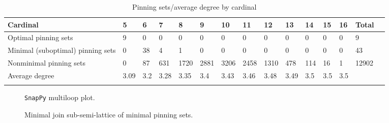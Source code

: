 \documentclass{article}%
\begin{document}
\begin{table}[ht]
	\caption{Pinning sets/average degree by cardinal}
	\centering
	\renewcommand{\arraystretch}{1.5}
	\begin{tabularx}{\textwidth}{lXXXXXXXXXXXXXX}
		\toprule
			Cardinal & 5 & 6 & 7 & 8 & 9 & 10 & 11 & 12 & 13 & 14 & 15 & 16 & Total\\
			\hline
			Optimal pinning sets & 9 & 0 & 0 & 0 & 0 & 0 & 0 & 0 & 0 & 0 & 0 & 0 & 9 \\
			Minimal (suboptimal) pinning sets & 0 & 38 & 4 & 1 & 0 & 0 & 0 & 0 & 0 & 0 & 0 & 0 & 43 \\
			Nonminimal pinning sets & 0 & 87 & 631 & 1720 & 2881 & 3206 & 2458 & 1310 & 478 & 114 & 16 & 1 & 12902 \\
			Average degree & 3.09 & 3.2 & 3.28 & 3.35 & 3.4 & 3.43 & 3.46 & 3.48 & 3.49 & 3.5 & 3.5 & 3.5 &  \\
		\bottomrule \\ 
	\end{tabularx}
\end{table}

\begin{multicols}{2}
\begin{figure}[H]
\centering

\caption{\texttt{SnapPy} multiloop plot.}
\label{fig:tex/img/[[5, 28, 6, 1], [15, 4, 16, 5], [10, 27, 11, 28], [6, 11, 7, 12], [1, 23, 2, 22], [14, 21, 15, 22], [3, 20, 4, 21], [16, 9, 17, 10], [17, 26, 18, 27], [7, 18, 8, 19], [12, 24, 13, 23], [2, 13, 3, 14],.svg}
\end{figure}
\columnbreak

\begin{figure}[H]
\centering
\scalebox{0.8}{}
\caption{Minimal join sub-semi-lattice of minimal pinning sets.}
\label{fig:tex/img/[[5, 28, 6, 1], [15, 4, 16, 5], [10, 27, 11, 28], [6, 11, 7, 12], [1, 23, 2, 22], [14, 21, 15, 22], [3, 20, 4, 21], [16, 9, 17, 10], [17, 26, 18, 27], [7, 18, 8, 19], [12, 24, 13, 23], [2, 13, 3, 14],.pgf}
\end{figure}
\end{multicols}
\end{document}
